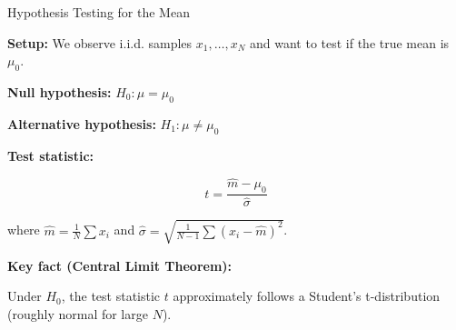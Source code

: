 \documentclass{beamer}
\begin{document}

\begin{frame}{Hypothesis Testing for the Mean}

\textbf{Setup:} We observe i.i.d. samples $x_1, \ldots, x_N$ and want to test if the true mean is $\mu_0$.

\vspace{0.3cm}

\textbf{Null hypothesis:} $H_0: \mu = \mu_0$

\textbf{Alternative hypothesis:} $H_1: \mu \ne \mu_0$

\vspace{0.5cm}

\textbf{Test statistic:}

\[
t = \frac{\hat{m} - \mu_0}{\hat{\sigma}}
\]

where $\hat{m} = \frac{1}{N}\sum x_i$ and $\hat{\sigma} = \sqrt{\frac{1}{N-1}\sum(x_i - \hat{m})^2}$.

\vspace{0.3cm}

\textbf{Key fact (Central Limit Theorem):}

Under $H_0$, the test statistic $t$ approximately follows a Student's t-distribution (roughly normal for large $N$).

\end{frame}
\end{document}

